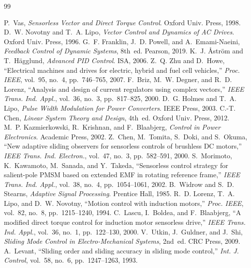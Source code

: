 \documentclass[10pt,twoside,a4paper]{article}
\begin{document}
\begingroup
\footnotesize
\begin{thebibliography}{99}
\setlength{\itemsep}{2pt}
\setlength{\parsep}{0pt}

 P.~Vas, \emph{Sensorless Vector and Direct Torque Control}. Oxford Univ. Press, 1998.
 D.~W. Novotny and T.~A. Lipo, \emph{Vector Control and Dynamics of AC Drives}. Oxford Univ. Press, 1996.
 G.~F. Franklin, J.~D. Powell, and A.~Emami-Naeini, \emph{Feedback Control of Dynamic Systems}, 8th~ed. Pearson, 2019.
 K.~J. \AA str{\"o}m and T.~H{\"a}gglund, \emph{Advanced PID Control}. ISA, 2006.
 Z.~Q. Zhu and D.~Howe, ``Electrical machines and drives for electric, hybrid and fuel cell vehicles,'' \emph{Proc. IEEE}, vol.~95, no.~4, pp.~746--765, 2007.
 F.~Briz, M.~W. Degner, and R.~D. Lorenz, ``Analysis and design of current regulators using complex vectors,'' \emph{IEEE Trans. Ind. Appl.}, vol.~36, no.~3, pp.~817--825, 2000.
 D.~G. Holmes and T.~A. Lipo, \emph{Pulse Width Modulation for Power Converters}. IEEE Press, 2003.
 C.-T. Chen, \emph{Linear System Theory and Design}, 4th~ed. Oxford Univ. Press, 2012.
 M.~P. Kazmierkowski, R.~Krishnan, and F.~Blaabjerg, \emph{Control in Power Electronics}. Academic Press, 2002.
 Z.~Chen, M.~Tomita, S.~Doki, and S.~Okuma, ``New adaptive sliding observers for sensorless controls of brushless DC motors,'' \emph{IEEE Trans. Ind. Electron.}, vol.~47, no.~3, pp.~582--591, 2000.
 S.~Morimoto, K.~Kawamoto, M.~Sanada, and Y.~Takeda, ``Sensorless control strategy for salient-pole PMSM based on extended EMF in rotating reference frame,'' \emph{IEEE Trans. Ind. Appl.}, vol.~38, no.~4, pp.~1054--1061, 2002.
 B.~Widrow and S.~D. Stearns, \emph{Adaptive Signal Processing}. Prentice Hall, 1985.
 R.~D. Lorenz, T.~A. Lipo, and D.~W. Novotny, ``Motion control with induction motors,'' \emph{Proc. IEEE}, vol.~82, no.~8, pp.~1215--1240, 1994.
 C.~Lascu, I.~Boldea, and F.~Blaabjerg, ``A modified direct torque control for induction motor sensorless drive,'' \emph{IEEE Trans. Ind. Appl.}, vol.~36, no.~1, pp.~122--130, 2000.
 V.~Utkin, J.~Guldner, and J.~Shi, \emph{Sliding Mode Control in Electro-Mechanical Systems}, 2nd~ed. CRC Press, 2009.
 A.~Levant, ``Sliding order and sliding accuracy in sliding mode control,'' \emph{Int. J. Control}, vol.~58, no.~6, pp.~1247--1263, 1993.

\end{thebibliography}
\end{document}

